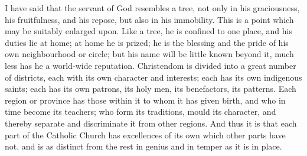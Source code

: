 I have said that the servant of God resembles a tree,
not only in his graciousness, his fruitfulness, and his
repose, but also in his immobility. This is a point which
may be suitably enlarged upon. Like a tree, he is
confined to one place, and his duties lie at home; at
home he is prized; he is the blessing and the pride of
his own neighbourhood or circle; but his name will be
little known beyond it, much less has he a world-wide
reputation. Christendom is divided into a great number of
districts, each with its own character and interests;
each has its own indigenous saints; each has its own
patrons, its holy men, its benefactors, its patterns.
Each region or province has those within it to whom it
has given birth, and who in time become its teachers; who
form its traditions, mould its character, and thereby
separate and discriminate it from other regions. And thus
it is that each part of the Catholic Church has
excellences of its own which other parts have not, and is
as distinct from the rest in genius and in temper as it
is in place.

